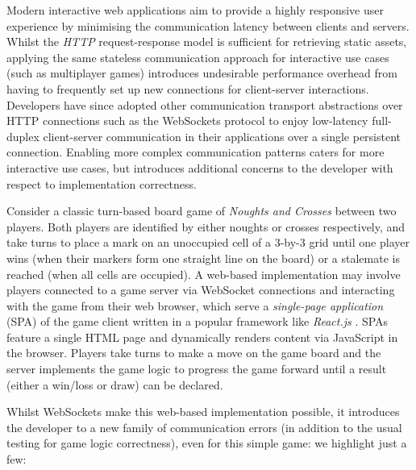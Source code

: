 

Modern interactive web applications aim to 
provide a highly responsive user experience by 
minimising the communication latency between clients and servers. 
Whilst the \textit{HTTP} request-response model is 
sufficient for retrieving static assets, applying the same 
stateless communication approach for interactive use cases 
(such as multiplayer games) introduces undesirable 
performance overhead from having to frequently set up 
new connections for client-server interactions. 
Developers have since adopted other communication 
transport abstractions over HTTP connections such as the WebSockets protocol \cite{WebSocketRFC} to enjoy low-latency full-duplex 
client-server communication in their applications over 
a single persistent connection. 
Enabling more complex communication patterns caters for 
more interactive use cases, but introduces additional 
concerns to the developer with respect to implementation correctness.

Consider a classic turn-based board game of \textit{Noughts and Crosses} 
between two players. Both players are identified by either noughts or crosses 
respectively, and take turns to place a mark on an unoccupied cell 
of a 3-by-3 grid until one player wins (when their markers form 
one straight line on the board) or a stalemate is reached 
(when all cells are occupied). A web-based implementation may 
involve players connected to a game server via WebSocket connections 
and interacting with the game from their web browser, which serve 
a \textit{single-page application} (SPA) of the game client written 
in a popular framework like \textit{React.js} \cite{React}. 
SPAs feature a single HTML page and dynamically renders content 
via JavaScript in the browser. 
Players take turns to make a move on the game board and the server 
implements the game logic to progress the game forward until 
a result (either a win/loss or draw) can be declared. 

Whilst WebSockets make this web-based implementation possible, 
it introduces the developer to a new family of communication errors
(in addition to the usual testing for game logic correctness), 
even for this simple game:
we highlight just a few:

